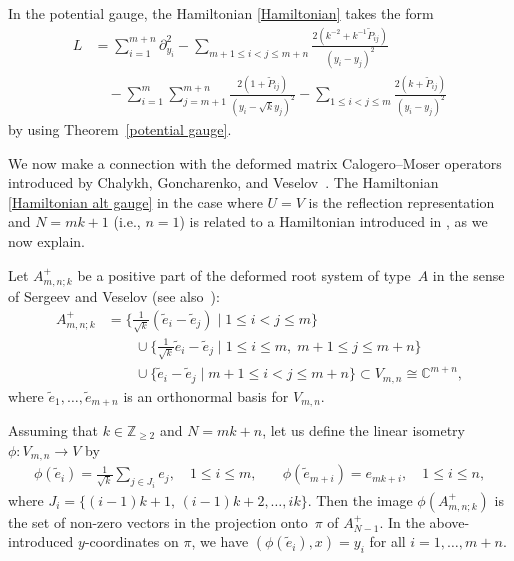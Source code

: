 \documentclass[12pt]{amsart}
\numberwithin{equation}{section}
\theoremstyle{definition}
\begin{document}
In the potential gauge, the Hamiltonian \eqref{Hamiltonian} takes the form 
\begin{equation}\label{Hamiltonian alt gauge}
    \begin{aligned}
        L &= \sum\limits_{i = 1}^{m + n} \partial_{y_i}^2 - \sum\limits_{m + 1 \leq i < j \leq m + n} \frac{2 (k^{-2} + k^{-1} \widetilde{P}_{ij})}{(y_i - y_j)^2} 
        \\
        &\quad - \sum\limits_{i = 1}^m \sum\limits_{j = m + 1}^{m + n}\frac{2(1 + \widetilde{P}_{ij})}{(y_i - \sqrt{k}y_j)^2} - \sum\limits_{1 \leq i < j \leq m} \frac{2(k + \widetilde{P}_{ij})}{(y_i - y_j)^2}
    \end{aligned}
\end{equation}
by using Theorem~\ref{potential gauge}.

We now make a connection with the deformed matrix Calogero--Moser operators introduced by Chalykh, Goncharenko, 
and Veselov~\cite{CGV}. The Hamiltonian \eqref{Hamiltonian alt gauge} in the case where $U=V$ is the reflection representation and $N= mk + 1$ (i.e., $n=1$) is related to a Hamiltonian
introduced in \cite{CGV}, as we now explain. 

Let $A_{m,n;k}^+$ be a positive part of the deformed root system of type~$A$ in the sense of Sergeev and Veselov \cite{SV} (see also~\cite{Serganova}):
\begin{align*}
    A_{m,n; k}^+ &= \{ \tfrac{1}{\sqrt{k}}(\widetilde{e}_i - \widetilde{e}_j) \mid 1 \leq i < j \leq m \}
    \\
    &\qquad \cup \{ \tfrac{1}{\sqrt{k}} \widetilde{e}_i - \widetilde{e}_j  \mid 1 \leq i \leq m, \; m+1 \leq j \leq m+n\}
    \\
    &\qquad \cup  \{ \widetilde{e}_i - \widetilde{e}_j \mid m+1 \leq i < j \leq m+n \}  \subset V_{m,n} \cong 
    \mathbb{C}^{m + n},
\end{align*}
where $\widetilde{e}_1, \ldots, \widetilde{e}_{m+n}$ is an orthonormal basis for $V_{m,n}$.

Assuming that $k \in \mathbb{Z}_{\geq 2}$ and $N = mk + n$,  
let us define the linear isometry $\phi \colon V_{m,n} \to V$ by
\begin{equation*}
    \begin{array}{cc}
        \phi(\widetilde{e}_{i}) = \frac{1}{\sqrt{k}}\sum\limits_{j \in J_{i}} e_j, \quad 1 \leq i \leq m,
        & \quad  \phi(\widetilde{e}_{m+i}) = e_{mk+i}, \quad 1 \leq i \leq n,
    \end{array}
\end{equation*}
where $J_i = \{(i-1)k + 1, \, (i-1)k + 2, \dots, ik \}$.
Then the image $\phi(A_{m,n; k}^+)$ is the set of non-zero vectors in the projection onto~$\pi$ of $A_{N-1}^+$.
In the above-introduced $y$-coordinates on $\pi$, we have $(\phi(\widetilde{e}_i), x) = y_i$ for all $i = 1, \dots, m+n$.
\end{document}
